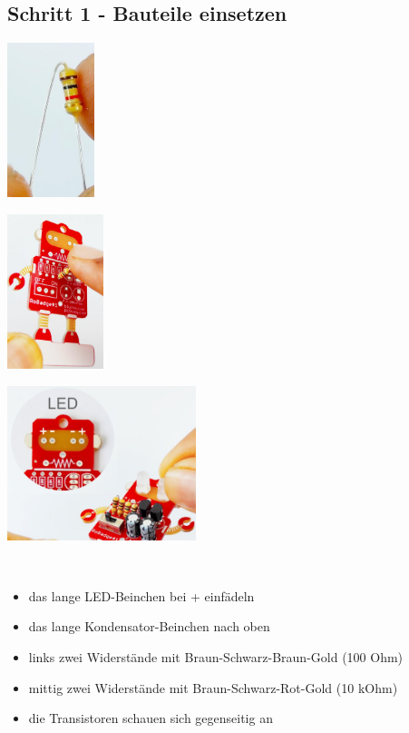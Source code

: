 \documentclass[a4paper]{article}
\begin{document}
\subsection{Schritt 1 - Bauteile einsetzen}
\begin{minipage}[t]{0.28\textwidth}
  \centering
  \includegraphics[height=4.5cm]{../pictures/Resistor1.jpg}
  \label{img:Resistor1}
  \end{minipage}
\begin{minipage}[t]{0.30\textwidth}
  \centering
  \includegraphics[height=4.5cm]{../pictures/Resistor2.jpg}
  \label{img:Resistor2}
\end{minipage}
\begin{minipage}[t]{0.40\textwidth}
  \centering
  \includegraphics[height=4.5cm]{../pictures/LED1.jpg}
  \label{img:Resistor3}
\end{minipage}
\ \\
\begin{itemize}
\item das lange LED-Beinchen bei + einfädeln
\item das lange Kondensator-Beinchen nach oben
\item links zwei Widerstände mit Braun-Schwarz-Braun-Gold (100 Ohm)
\item mittig zwei Widerstände mit Braun-Schwarz-Rot-Gold (10 kOhm)
\item die Transistoren schauen sich gegenseitig an
\end{itemize}
\end{document}
